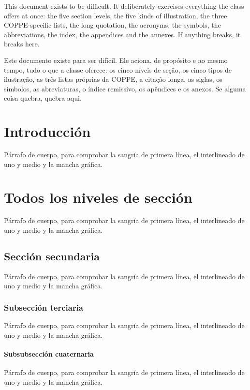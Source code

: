 \documentclass[dsc,spanish,pdfa,coorientador,numbers,orientadorexamina]{coppe}
\begin{document}
  \begin{foreignabstract}
  This document exists to be difficult. It deliberately exercises everything the class offers at once: the five section levels, the five kinds of illustration, the three COPPE-specific lists, the long quotation, the acronyms, the symbols, the abbreviations, the index, the appendices and the annexes. If anything breaks, it breaks here.
  \end{foreignabstract}

  \begin{brazilianabstract}
  Este documento existe para ser difícil. Ele aciona, de propósito e ao mesmo tempo, tudo o que a classe oferece: os cinco níveis de seção, os cinco tipos de ilustração, as três listas próprias da COPPE, a citação longa, as siglas, os símbolos, as abreviaturas, o índice remissivo, os apêndices e os anexos. Se alguma coisa quebra, quebra aqui.
  \end{brazilianabstract}

  \listoffigures
  \listoftables
  \listofquadros
  \listofprogramas
  \listofalgorithms
  \printloabbreviations
  \printlosymbols
  \tableofcontents

  \mainmatter
  \chapter{Introducción}\label{cap:intro}
  Párrafo de cuerpo, para comprobar la sangría de primera línea, el interlineado de uno y medio y la mancha gráfica.

  \chapter{Todos los niveles de sección}
  Párrafo de cuerpo, para comprobar la sangría de primera línea, el interlineado de uno y medio y la mancha gráfica.
  \section{Sección secundaria}
  Párrafo de cuerpo, para comprobar la sangría de primera línea, el interlineado de uno y medio y la mancha gráfica.
  \subsection{Subsección terciaria}
  Párrafo de cuerpo, para comprobar la sangría de primera línea, el interlineado de uno y medio y la mancha gráfica.
  \subsubsection{Subsubsección cuaternaria}
  Párrafo de cuerpo, para comprobar la sangría de primera línea, el interlineado de uno y medio y la mancha gráfica.
\end{document}
